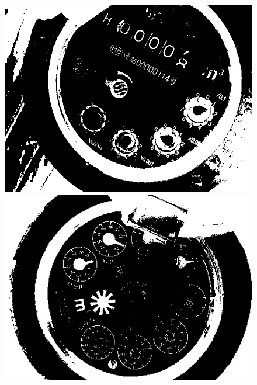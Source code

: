 \documentclass[a4paper]{ctexart}
\begin{document}
\begin{figure}[htbp]
\begin{minipage}[t]{0.25\textwidth}
		\includegraphics[width=\textwidth]{figure/kmeans/img3.jpg}
	\end{minipage}
	\begin{minipage}[t]{0.25\textwidth}
		\centering
		\includegraphics[width=\textwidth]{figure/kmeans/img4.jpg}
	\end{minipage}
	\begin{minipage}[t]{0.25\textwidth}
		\centering

\end{minipage}
\end{figure}
\end{document}
